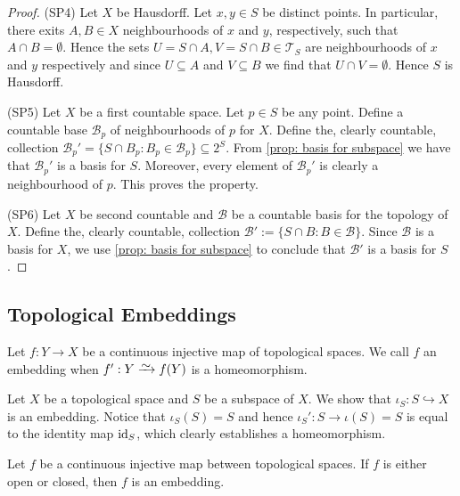 \begin{proof}
  (SP4) Let \(X\) be Hausdorff. Let \(x, y \in S\) be distinct points. In
  particular, there exits \(A, B \in X\) neighbourhoods of \(x\) and \(y\),
  respectively, such that \(A \cap B = \emptyset\). Hence the sets \(U = S \cap
  A, V = S \cap B \in \mathcal T_S\) are neighbourhoods of \(x\) and \(y\)
  respectively and since \(U \subseteq A\) and \(V \subseteq B\) we find that
  \(U \cap V = \emptyset\). Hence \(S\) is Hausdorff.

  (SP5) Let \(X\) be a first countable space. Let \(p \in S\) be any point.
  Define a countable base \(\mathcal B_p\) of neighbourhoods of \(p\) for \(X\).
  Define the, clearly countable, collection \(\mathcal B_p' = \{S \cap B_p: B_p
  \in \mathcal B_p\} \subseteq 2^S\). From \cref{prop: basis for subspace} we
  have that \(\mathcal B_p'\) is a basis for \(S\). Moreover, every element of
  \(\mathcal B_p'\) is clearly a neighbourhood of \(p\). This proves the
  property.

  (SP6) Let \(X\) be second countable and \(\mathcal B\) be a countable basis
  for the topology of \(X\). Define the, clearly countable, collection
  \(\mathcal B' := \{S \cap B : B \in \mathcal B\}\). Since \(\mathcal B\) is a
  basis for \(X\), we use \cref{prop: basis for subspace} to conclude that
  \(\mathcal B'\) is a basis for \(S\).
\end{proof}

\subsection{Topological Embeddings}

\begin{definition}[Embedding]\label{def: topological embedding}
  Let \(f: Y \to X\) be a continuous injective map of topological spaces. We
  call \(f\) an embedding when \(f': Y \isoto f(Y)\) is a homeomorphism.
\end{definition}

\begin{example}
  Let \(X\) be a topological space and \(S\) be a subspace of \(X\). We show
  that \(\iota_S: S \hookrightarrow X\) is an embedding. Notice that
  \(\iota_S(S) = S\) and hence \(\iota_S': S \to \iota(S) = S\) is equal to the
  identity map \(\operatorname{id}_S\), which clearly establishes a homeomorphism.
\end{example}

\begin{proposition}
  Let \(f\) be a continuous injective map between topological spaces. If \(f\)
  is either open or closed, then \(f\) is an embedding.
\end{proposition}

